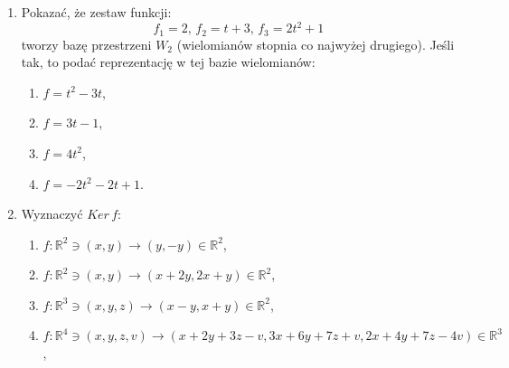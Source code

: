 \documentclass{article}
\begin{document}
\begin{enumerate}
\begin{enumerate}
            \item $\left\{ \begin{bmatrix}\begin{array}{r} 0\\ 1\\ k \end{array}\end{bmatrix},          \begin{bmatrix}\begin{array}{r} k\\ 0\\ 1 \end{array}\end{bmatrix}, 
            \begin{bmatrix}\begin{array}{c} k\\ 1\\ k+1 \end{array}\end{bmatrix}\right\}$.
        \end{enumerate}

    \item Pokazać, że zestaw funkcji:
        $$ f_{1} = 2,\,f_{2}=t+3,\,f_{3} = 2t^{2}+1$$
        tworzy bazę przestrzeni $W_{2}$ (wielomianów stopnia co najwyżej drugiego). Jeśli tak, to podać reprezentację w tej bazie wielomianów:
        \begin{enumerate}
            \item $f = t^2-3t$,
            \item $f = 3t-1$,
            \item $f = 4t^2$,
            \item $f = -2t^{2}-2t+1$.
        \end{enumerate}

    \item Wyznaczyć $Ker\,f$:
        \begin{enumerate}
            \item $f: \mathbb{R}^{2} \ni (x, y) \rightarrow (y, -y) \in \mathbb{R}^{2}$,
            \item $f: \mathbb{R}^{2} \ni (x, y) \rightarrow (x + 2y, 2x + y) \in \mathbb{R}^{2}$,
            \item $f: \mathbb{R}^{3} \ni (x, y, z) \rightarrow (x - y, x + y) \in \mathbb{R}^{2}$,
            \item $f: \mathbb{R}^{4} \ni (x, y, z, v) \rightarrow (x+2y+3z-v,3x+6y+7z+v,2x+4y+7z-4v) \in \mathbb{R}^{3}$,
        \end{enumerate}


\end{enumerate}
\end{document}
